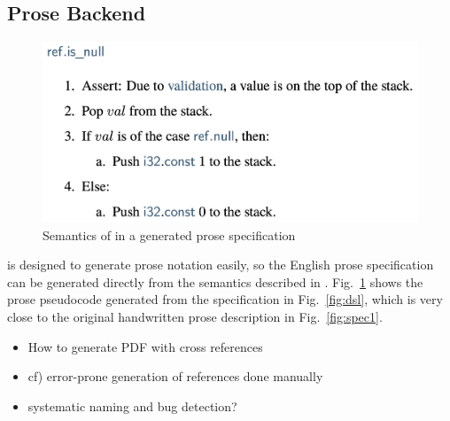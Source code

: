 \subsection{Prose Backend}\label{sec:prose} %
\begin{figure}[t]
\centering
\includegraphics[width=.5\textwidth]{../img/genprose}
\vspace*{-1em}
\caption{Semantics of  in a generated prose specification}
\label{fig:genprose}
\end{figure}

\al is designed to generate prose notation easily,
so the English prose specification can be generated directly from the semantics described in \al.
Fig.~\ref{fig:genprose} shows the prose pseudocode generated from the specification in Fig.~\ref{fig:dsl},
which is very close to the original handwritten prose description in Fig.~\ref{fig:spec1}.

\begin{itemize}
\item How to generate PDF with cross references
\item cf) error-prone generation of references done manually
\item systematic naming and bug detection?
\end{itemize}
